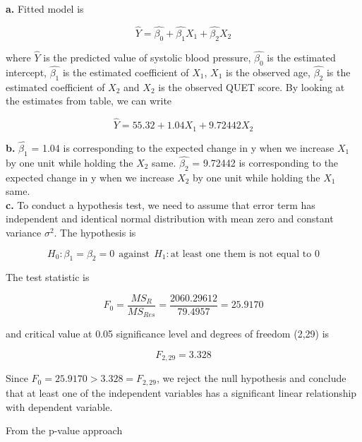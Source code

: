 \documentclass{article}
\begin{document}
\newpage
\textbf{a.}
Fitted model is

\begin{equation}
    \hat{Y} = \hat{\beta_0} + \hat{\beta_1}X_1 + \hat{\beta_2}X_2
\end{equation}

where $\hat{Y}$ is the predicted value of systolic blood pressure, $\hat{\beta_0}$ is the estimated intercept, $\hat{\beta_1}$ is the estimated coefficient of $X_1$, $X_1$ is the observed age, $\hat{\beta_2}$ is the estimated coefficient of $X_2$ and $X_2$ is the observed QUET score. By looking at the estimates from table, we can write

\begin{equation}
     \hat{Y} = 55.32 + 1.04X_1 + 9.72442X_2
\end{equation}

\textbf{b.} $\hat{\beta_1}$ = 1.04 is corresponding to the expected change in y when we increase $X_1$ by one unit while holding the $X_2$ same. $\hat{\beta_2}$ = 9.72442 is corresponding to the expected change in y when we increase $X_2$ by one unit while holding the $X_1$ same.
\\

\textbf{c.} To conduct a hypothesis test, we need to assume that error term has independent and identical normal distribution with mean zero and constant variance $\sigma^2$. The hypothesis is 

\begin{equation}
    H_0: \beta_1 = \beta_2 = 0 \ \ \text{against} \ \ H_1: \text{at least one them is not equal to 0}
\end{equation}

The test statistic is

\begin{equation}
    F_0 = \frac{MS_R}{MS_{Res}} = \frac{2060.29612}{79.4957} = 25.9170
\end{equation}

and critical value at 0.05 significance level and degrees of freedom (2,29) is 

\begin{equation}
    F_{2,29} = 3.328
\end{equation}

Since $F_0 = 25.9170 > 3.328 = F_{2,29}$, we reject the null hypothesis and conclude that at least one of the independent variables has a significant linear relationship with dependent variable.

From the p-value approach
\end{document}
